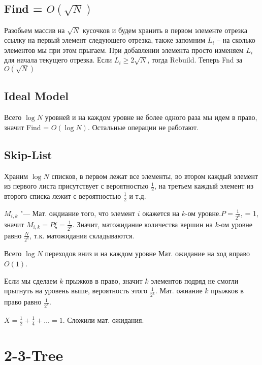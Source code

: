 \subsection{Find = $O(\sqrt{N})$}

Разобьем массив на $\sqrt{N}$ кусочков и будем хранить в первом элементе отрезка ссылку на первый элемент следующего отрезка, также запомним $L_{i}$ -- на сколько элементов мы при этом прыгаем. При добавлении элемента просто изменяем $L_{i}$ для начала текущего отрезка. Если $L_{i} \geqslant 2 \sqrt{N}$, тогда Rebuild. Теперь Fnd за $O(\sqrt{N})$\\



\subsection{Ideal Model}


Всего $\log{N}$ уровней и на каждом уровне не более одного раза мы идем в право, значит Find = $O(\log{N})$. Остальные операции не работают.


\subsection{Skip-List}

Храним $\log{N}$ списков, в первом лежат все элементы, во втором каждый элемент из первого листа присутствует с вероятностью $\frac{1}{2}$, на третьем каждый элемент из второго списка лежит с вероятностью $\frac{1}{2}$ и т.д.

$M_{i, k}$ "--- Мат. ождиание того, что элемент $i$ окажется на $k$-ом уровне.$ P = \frac{1}{2^{k}}$, \xi = 1, значит $M_{i,k} = P \xi = \frac{1}{2^{k}}$.
Значит, матожидание количества вершин на $k$-ом уровне равно $\frac{N}{2^{k}}$, т.к. матожидания складываются.

Всего $\log{N}$ переходов вниз и на каждом уровне Мат. ожидание на ход вправо $O(1)$.

Если мы сделаем $k$ прыжков в право, значит $k$ элементов подряд не смогли прыгнуть на уровень выше, вероятность этого $\frac{1}{2^{k}}$. Мат. ожиание $k$ прыжков в право равно $\frac{1}{2^{k}}$.

$X = \frac{1}{2} + \frac{1}{4} + \dots = 1$. Сложили мат. ожидания.

\section{2-3-Tree}

